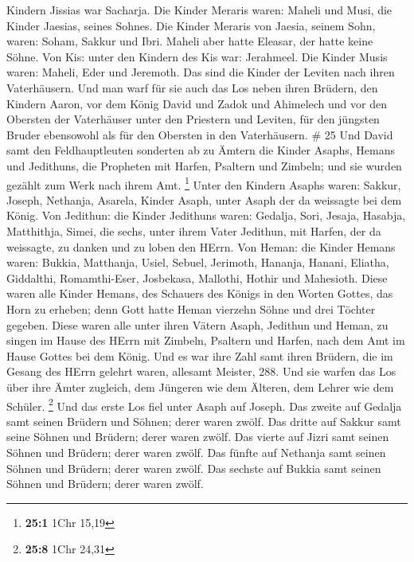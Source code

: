Kindern Jissias war Sacharja.  Die Kinder Meraris waren:
Maheli und Musi, die Kinder Jaesias, seines Sohnes.  Die
Kinder Meraris von Jaesia, seinem Sohn, waren: Soham, Sakkur und Ibri.
 Maheli aber hatte Eleasar, der hatte keine Söhne.
 Von Kis: unter den Kindern des Kis war: Jerahmeel.
 Die Kinder Musis waren: Maheli, Eder und Jeremoth. Das
sind die Kinder der Leviten nach ihren Vaterhäusern.  Und
man warf für sie auch das Los neben ihren Brüdern, den Kindern Aaron,
vor dem König David und Zadok und Ahimelech und vor den Obersten der
Vaterhäuser unter den Priestern und Leviten, für den jüngsten Bruder
ebensowohl als für den Obersten in den Vaterhäusern. \# 25 
Und David samt den Feldhauptleuten sonderten ab zu Ämtern die Kinder
Asaphs, Hemans und Jedithuns, die Propheten mit Harfen, Psaltern und
Zimbeln; und sie wurden gezählt zum Werk nach ihrem Amt. \footnote{\textbf{25:1}
  1Chr 15,19}  Unter den Kindern Asaphs waren: Sakkur,
Joseph, Nethanja, Asarela, Kinder Asaph, unter Asaph der da weissagte
bei dem König.  Von Jedithun: die Kinder Jedithuns waren:
Gedalja, Sori, Jesaja, Hasabja, Matthithja, Simei, die sechs, unter
ihrem Vater Jedithun, mit Harfen, der da weissagte, zu danken und zu
loben den HErrn.  Von Heman: die Kinder Hemans waren:
Bukkia, Matthanja, Usiel, Sebuel, Jerimoth, Hananja, Hanani, Eliatha,
Giddalthi, Romamthi-Eser, Josbekasa, Mallothi, Hothir und Mahesioth.
 Diese waren alle Kinder Hemans, des Schauers des Königs in
den Worten Gottes, das Horn zu erheben; denn Gott hatte Heman vierzehn
Söhne und drei Töchter gegeben.  Diese waren alle unter
ihren Vätern Asaph, Jedithun und Heman, zu singen im Hause des HErrn mit
Zimbeln, Psaltern und Harfen, nach dem Amt im Hause Gottes bei dem
König.  Und es war ihre Zahl samt ihren Brüdern, die im
Gesang des HErrn gelehrt waren, allesamt Meister, 288.  Und
sie warfen das Los über ihre Ämter zugleich, dem Jüngeren wie dem
Älteren, dem Lehrer wie dem Schüler. \footnote{\textbf{25:8} 1Chr 24,31}
 Und das erste Los fiel unter Asaph auf Joseph. Das zweite
auf Gedalja samt seinen Brüdern und Söhnen; derer waren zwölf.
 Das dritte auf Sakkur samt seine Söhnen und Brüdern; derer
waren zwölf.  Das vierte auf Jizri samt seinen Söhnen und
Brüdern; derer waren zwölf.  Das fünfte auf Nethanja samt
seinen Söhnen und Brüdern; derer waren zwölf.  Das sechste
auf Bukkia samt seinen Söhnen und Brüdern; derer waren zwölf.
